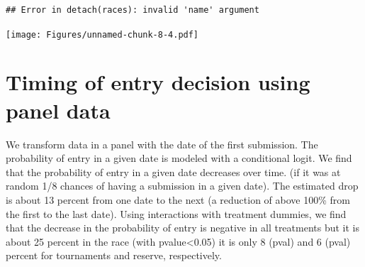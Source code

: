 \documentclass[]{article}
\begin{document}
\begin{verbatim}
## Error in detach(races): invalid 'name' argument
\end{verbatim}

\texttt{[image: Figures/unnamed-chunk-8-4.pdf]}

\section{Timing of entry decision using panel
data}\label{timing-of-entry-decision-using-panel-data}

We transform data in a panel with the date of the first submission. The
probability of entry in a given date is modeled with a conditional
logit. We find that the probability of entry in a given date decreases
over time. (if it was at random 1/8 chances of having a submission in a
given date). The estimated drop is about 13 percent from one date to the
next (a reduction of above 100\% from the first to the last date). Using
interactions with treatment dummies, we find that the decrease in the
probability of entry is negative in all treatments but it is about 25
percent in the race (with pvalue\textless{}0.05) it is only 8 (pval) and
6 (pval) percent for tournaments and reserve, respectively.
\end{document}
